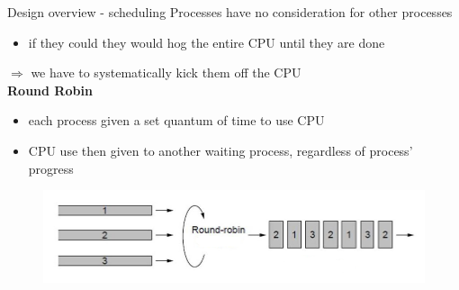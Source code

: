 \documentclass[10pt]{beamer}
\begin{document}
\begin{frame}{Design overview - scheduling}
    Processes have no consideration for other processes
    \begin{itemize}
        \item if they could they would hog the entire CPU until they are done
    \end{itemize}
    $ \Rightarrow$ we have to systematically kick them off the CPU \\

    \textbf{Round Robin}
    \begin{itemize}
        \item each process given a set quantum of time to use CPU
        \item CPU use then given to another waiting process, regardless of process' progress
    \end{itemize}
    \begin{figure}
        \centering
        \includegraphics[width=.8\textwidth]{round_robin.jpg}
    \end{figure}
\end{frame}
\end{document}
